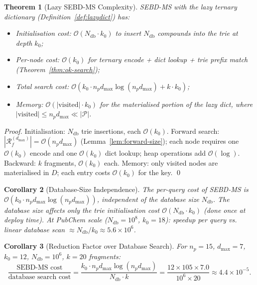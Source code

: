 \documentclass[twocolumn,10pt,a4paper]{article}
\theoremstyle{thmstyle}
\newtheorem{theorem}{Theorem}[section]
\newtheorem{corollary}[theorem]{Corollary}
\theoremstyle{definition}
\theoremstyle{remark}
\newcommand{\Parts}{\mathcal{P}}
\newcommand{\Reachf}{\mathcal{R}_f}
\begin{document}
\begin{theorem}[Lazy SEBD-MS Complexity]
\label{thm:complexity}
SEBD-MS with the lazy ternary dictionary
(Definition~\ref{def:lazydict}) has:
\begin{itemize}[nosep]
\item \emph{Initialisation cost}: $\mathcal{O}(N_\text{db} \cdot k_0)$
  to insert $N_\text{db}$ compounds into the trie at depth $k_0$;
\item \emph{Per-node cost}: $\mathcal{O}(k_0)$ for ternary encode +
  dict lookup + trie prefix match (Theorem~\ref{thm:ok-search});
\item \emph{Total search cost}: $\mathcal{O}\!\left(k_0 \cdot
  n_p d_\text{max} \log(n_p d_\text{max}) + k \cdot k_0\right)$;
\item \emph{Memory}: $\mathcal{O}(|\text{visited}| \cdot k_0)$
  for the materialised portion of the lazy dict, where
  $|\text{visited}| \leq n_p d_\text{max} \ll |\Parts|$.
\end{itemize}
\end{theorem}

\begin{proof}
Initialisation: $N_\text{db}$ trie insertions, each $\mathcal{O}(k_0)$.
Forward search: $|\Reachf^{(d_\text{max})}| = \mathcal{O}(n_p d_\text{max})$
(Lemma~\ref{lem:forward-size}); each node requires one $\mathcal{O}(k_0)$
encode and one $\mathcal{O}(k_0)$ dict lookup; heap operations add
$\mathcal{O}(\log)$. Backward: $k$ fragments, $\mathcal{O}(k_0)$ each.
Memory: only visited nodes are materialised in $D$; each entry costs
$\mathcal{O}(k_0)$ for the key. \qed
\end{proof}

\begin{corollary}[Database-Size Independence]
\label{cor:db-independent}
The per-query cost of SEBD-MS is $\mathcal{O}(k_0 \cdot n_p d_\text{max}
\log(n_p d_\text{max}))$, \emph{independent of the database size}
$N_\text{db}$.
The database size affects only the trie initialisation cost
$\mathcal{O}(N_\text{db} \cdot k_0)$ (done once at deploy time).
At PubChem scale ($N_\text{db} = 10^8$, $k_0 = 18$):
speedup per query vs. linear database scan $\approx
N_\text{db}/k_0 \approx 5.6 \times 10^6$.
\end{corollary}

\begin{corollary}[Reduction Factor over Database Search]
\label{cor:reduction}
For $n_p = 15$, $d_\text{max} = 7$, $k_0 = 12$, $N_\text{db} = 10^6$,
$k = 20$ fragments:
\begin{equation}
\frac{\text{SEBD-MS cost}}{\text{database search cost}}
= \frac{k_0 \cdot n_p d_\text{max} \log(n_p d_\text{max})}
       {N_\text{db} \cdot k}
= \frac{12 \times 105 \times 7.0}{10^6 \times 20} \approx 4.4 \times 10^{-5}.
\end{equation}
\end{corollary}
\end{document}
